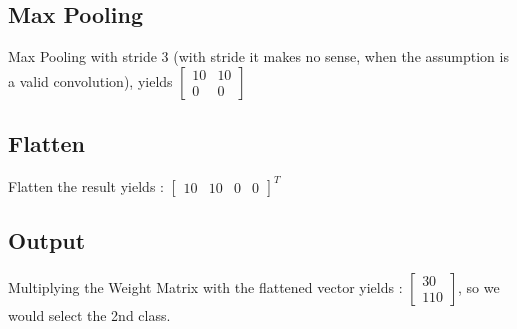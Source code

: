 \documentclass[10pt]{article}
\begin{document}
\subsection{Max Pooling}
Max Pooling with stride 3 (with stride it makes no sense, when the assumption is a valid convolution), yields
$\begin{bmatrix}
10&10\\
0&0
\end{bmatrix}$

\subsection{Flatten}
Flatten the result yields : $\begin{bmatrix}
10&10&0&0
\end{bmatrix}^T$
\subsection{Output}
Multiplying the Weight Matrix with the flattened vector yields : $\begin{bmatrix}
30\\
110
\end{bmatrix}$, so we would select the 2nd class.
\end{document}
